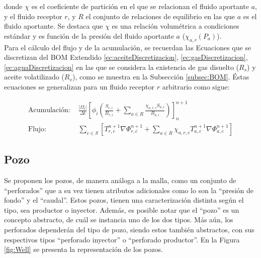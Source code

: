 donde $\chi$ es el coeficiente de partición en el que se relacionan el fluido aportante $a$, y el fluido receptor $r$, y $R$ el conjunto de relaciones de equilibrio en las que $a$ es el fluido aportante. Se destaca que $\chi$ es una relación volumétrica a condiciones estándar y es función de la presión del fluido aportante $a$ ($\chi_{a,r}\left(P_{a}\right)$).\\



Para el cálculo del flujo y de la acumulación, se recuerdan las Ecuaciones que se discretizan del BOM Extendido \ref{ec:aceiteDiscretizacion}, \ref{ec:gasDiscretizacion}, \ref{ec:aguaDiscretizacion} en las que se considera la existencia de gas disuelto ($R_{s}$) y aceite volatilizado ($R_v$), como se muestra en la Subsección \ref{subsec:BOM}. Éstas ecuaciones se generalizan para un fluido receptor $r$ arbitrario como sigue:

\begin{align}
	\label{ec:acumulacion_releq}\text{Acumulación: }&\frac{|\Omega_{i}|}{\Delta t}\left[ \phi_{i} \left( \frac{S_{r,i}}{B_{r,i}} + \sum_{a \in R}\frac{\chi_{a,r,i}S_{a,i}}{B_{a,i}}\right)\right]^{n+1}_{n}\\
	\label{ec:flujo_releq}\text{Flujo: }&\sum_{c \in S}\left[ T^{n+1}_{r,c} \nabla{\Phi_{r,c}^{n+1}} + \sum_{a \in R}\chi_{a,r,c} T^{n+1}_{a,c} \nabla{\Phi_{a,c}^{n+1}} \right]
\end{align}

\subsection{Pozo}\label{subsec:PS_Well}
Se proponen los pozos, de manera análoga a la malla, como un conjunto de ``perforados'' que a su vez tienen atributos adicionales como lo son la ``presión de fondo'' y el ``caudal''. Estos pozos, tienen una caracterización distinta según el tipo, sea productor o inyector. Además, es posible notar que el ``pozo'' es un concepto abstracto, de cuál se instancia uno de los dos tipos. Más aún, los perforados dependerán del tipo de pozo, siendo estos también abstractos, con sus respectivos tipos ``perforado inyector'' o ``perforado productor''. En la Figura \ref{fig:Well} se presenta la representación de los pozos.\\

